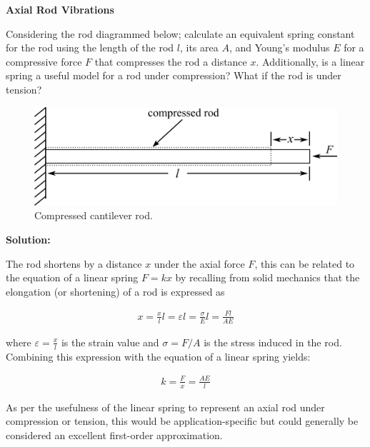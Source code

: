 \documentclass[12pt,letter]{article}
\begin{document}
			\begin{example}
    			
    		\textbf{Axial Rod Vibrations}

			\noindent	Considering the rod diagrammed below; calculate an equivalent spring constant for the rod using the length of the rod $l$, its area $A$, and Young's modulus $E$ for a compressive force $F$ that compresses the rod a distance $x$. Additionally, is a linear spring a useful model for a rod under compression? What if the rod is under tension?
        
		 		\begin{figure}[H]
		 			\centering
		 			\includegraphics[]{../figures/compressed_cantilever_rod.png}
		 			\caption{Compressed cantilever rod. }
		 		\end{figure}	   
       
			    \noindent \textbf{Solution:}

				 The rod shortens by a distance $x$ under the axial force $F$, this can be related to the equation of a linear spring $F=kx$ by recalling from solid mechanics that the elongation (or shortening) of a rod is expressed as 
			
			    \begin{eqnarray}
			    x=\frac{x}{l}l=\varepsilon l = \frac{\sigma}{E}l = \frac{Fl}{AE}
			    \end{eqnarray}    
			    
			    where  $\varepsilon = \frac{x}{l}$ is the strain value and $\sigma = F/A$ is the stress induced in the rod. Combining this expression with the equation of a linear spring yields:
			    
			    \begin{eqnarray}
			    k = \frac{F}{x}= \frac{AE}{l}
			    \end{eqnarray}     
			   
			    As per the usefulness of the linear spring to represent an axial rod under compression or tension, this would be application-specific but could generally be considered an excellent first-order approximation.  
			
			\end{example}
\end{document}
